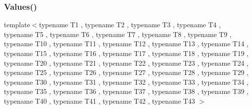 \mbox{\label{namespacetesting_a316b2e13e635215ac89a50315bb66d81}} 
\subsubsection{\texorpdfstring{Values()}{Values()}\hspace{0.1cm}{\footnotesize\ttfamily [44/51]}}
{\footnotesize\ttfamily template$<$typename T1 , typename T2 , typename T3 , typename T4 , typename T5 , typename T6 , typename T7 , typename T8 , typename T9 , typename T10 , typename T11 , typename T12 , typename T13 , typename T14 , typename T15 , typename T16 , typename T17 , typename T18 , typename T19 , typename T20 , typename T21 , typename T22 , typename T23 , typename T24 , typename T25 , typename T26 , typename T27 , typename T28 , typename T29 , typename T30 , typename T31 , typename T32 , typename T33 , typename T34 , typename T35 , typename T36 , typename T37 , typename T38 , typename T39 , typename T40 , typename T41 , typename T42 , typename T43 $>$ \\
}
